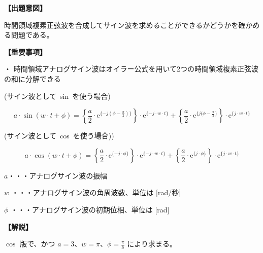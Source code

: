 \noindent \textbf{【出題意図】}

\bigskip
\noindent 時間領域複素正弦波を合成してサイン波を求めることができるかどうかを確かめる問題である。

\vspace{1em}
\noindent \textbf{【重要事項】}

\medskip
\noindent ・ 時間領域アナログサイン波はオイラー公式を用いて2つの時間領域複素正弦波の和に分解できる

\medskip
\noindent \mbox{(サイン波として sin を使う場合)}

\[
a \cdot \sin ( w \cdot t + \phi )
=  \left \{ \frac{a}{2} \cdot \textrm{e}^{\{-j (\phi-\frac{\pi}{2}) \}} \right \} \cdot \textrm{e}^{\{-j \cdot w \cdot t \}}
+  \left \{ \frac{a}{2} \cdot \textrm{e}^{\{j (\phi-\frac{\pi}{2} \}} \right \} \cdot \textrm{e}^{\{j \cdot w \cdot t \}}
\]

\medskip
\noindent \mbox{(サイン波として cos を使う場合))}

\[
a \cdot \cos ( w \cdot t + \phi )
=  \left \{ \frac{a}{2} \cdot \textrm{e}^{\{-j \cdot \phi \}} \right \} \cdot \textrm{e}^{\{-j \cdot w \cdot t \}}
+  \left \{ \frac{a}{2} \cdot \textrm{e}^{\{j  \cdot \phi \}} \right \} \cdot \textrm{e}^{\{j \cdot w \cdot t \}}
\]

\bigskip
\noindent  $a$・・・アナログサイン波の振幅

\bigskip
\noindent $w$ ・・・アナログサイン波の角周波数、単位は [rad/秒]

\bigskip
\noindent $\phi$ ・・・アナログサイン波の初期位相、単位は [rad]

\bigskip

\vspace{1em}
\noindent \textbf{【解説】}

\bigskip
\noindent $\cos$ 版で、かつ $a = 3$、$w = \pi$、$\phi = \frac{\pi}{8}$ により求まる。
